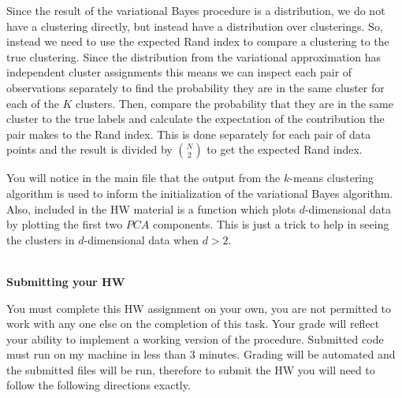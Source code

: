 \documentclass[12pt]{article}
\begin{document}
{\noindent Since the result of the variational Bayes procedure is a distribution, we do not have a clustering directly, but instead have a distribution over clusterings.  So, instead we need to use the expected  Rand index to compare a clustering to the true clustering.  Since the distribution from the variational approximation has independent cluster assignments this means we can inspect each pair of observations separately to find the probability they are in the same cluster for each of the $K$ clusters.  Then, compare the probability that they are in the same cluster to the true labels and calculate the expectation of the contribution the pair makes to the  Rand index.  This is done separately for each pair of data points and the result is divided by ${N \choose 2}$ to get the expected  Rand index.


 You will notice in the main file that the output from the $k$-means clustering algorithm is used to inform the initialization of the variational Bayes algorithm.  Also, included in the HW material is a function which plots $d$-dimensional data by plotting the first two $PCA$ components.  This is just a trick to help in seeing the clusters in $d$-dimensional data when $d > 2$.\\ \\}

{\bf Submitting your HW}

You must complete this HW assignment on your own, you are not permitted to work with any one else on the completion of this task.  Your grade will reflect your ability to implement a working version of the procedure.  Submitted code must run on my machine in less than 3 minutes.  Grading will be automated and the submitted files will be run, therefore to submit the HW you will need to follow the following directions exactly.
\end{document}
